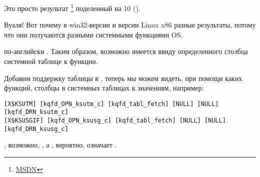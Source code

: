 Это просто результат 
\footnote{\href{http://go.yurichev.com/17248}{MSDN}}
поделенный на 10 ().

Вуаля! Вот почему в win32-версии и версии Linux x86 разные результаты, потому что они получаются разными 
системными функциями \ac{OS}.

 по-английски . Таким образом, возможно имеется ввиду  
определенного столбца системной таблице к функции.

Добавим поддержку таблицы  в \oracletables, 
теперь мы можем видеть, при помощи каких функций, столбцы в системных таблицах  к значениям, 
например:

\begin{lstlisting}
[X$KSUTM] [kqfd_OPN_ksutm_c] [kqfd_tabl_fetch] [NULL] [NULL] [kqfd_DRN_ksutm_c]
[X$KSUSGIF] [kqfd_OPN_ksusg_c] [kqfd_tabl_fetch] [NULL] [NULL] [kqfd_DRN_ksusg_c]
\end{lstlisting}

, возможно, , а , вероятно, означает .

